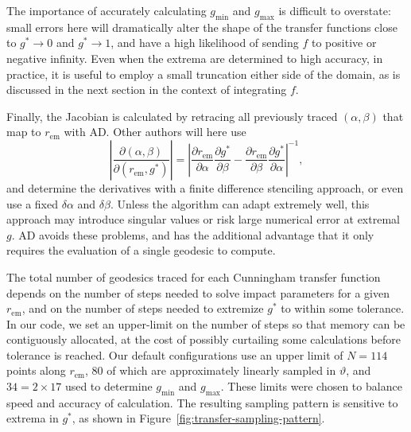 \documentclass[fleqn,usenatbib]{mnras}
\newcommand{\pderiv}[2]{\frac{\partial #1}{\partial #2}}
\newcommand{\rhoem}{r_\text{em}}
\begin{document}
The importance of accurately calculating $g_\text{min}$ and $g_\text{max}$ is
difficult to overstate: small errors here will dramatically alter the shape of
the transfer functions close to $g^\ast \rightarrow 0$ and $g^\ast \rightarrow
1$, and have a high likelihood of sending $f$ to positive or negative infinity.
Even when the extrema are determined to high accuracy, in practice, it is useful
to employ a small truncation either side of the domain, as is discussed in the
next section in the context of integrating $f$.

Finally, the Jacobian is calculated by retracing all previously traced $(\alpha,
\beta)$ that map to $\rhoem$ with AD. Other authors will here use
\begin{equation}
    \left\lvert
    \pderiv{(\alpha, \beta)}{(\rhoem, g^\ast)}
    \right\rvert
    =
    \left\lvert
    \pderiv{\rhoem}{\alpha}\pderiv{g^\ast}{\beta}
    -
    \pderiv{\rhoem}{\beta}\pderiv{g^\ast}{\alpha}
    \right\rvert^{-1},
\end{equation}
and determine the derivatives with a finite difference stenciling approach, or
even use a fixed $\delta \alpha$ and $\delta \beta$. Unless the algorithm can
adapt extremely well, this approach may introduce singular values or risk large
numerical error at extremal $g$. AD avoids these problems, and has the
additional advantage that it only requires the evaluation of a single geodesic
to compute.

The total number of geodesics traced for each Cunningham transfer function
depends on the number of steps needed to solve impact parameters for a given
$\rhoem$, and on the number of steps needed to extremize $g^\ast$ to within
some tolerance. In our code, we set an upper-limit on the number of steps so
that memory can be contiguously allocated, at the cost of possibly curtailing
some calculations before tolerance is reached. Our default configurations use an
upper limit of $N = 114$ points along $\rhoem$, $80$ of which are
approximately linearly sampled in $\vartheta$, and $34 = 2 \times 17$ used to
determine $g_\text{min}$ and $g_\text{max}$. These limits were chosen to balance
speed and accuracy of calculation. The resulting sampling pattern is sensitive
to extrema in $g^\ast$, as shown in Figure~\ref{fig:transfer-sampling-pattern}.
\end{document}
